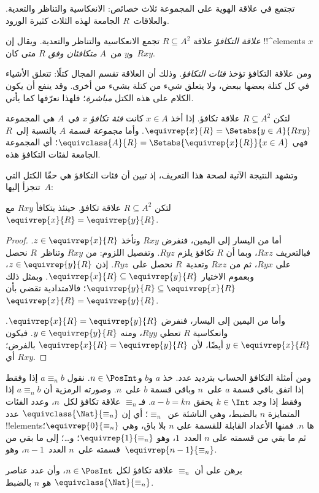 \documentclass[../../../include/open-logic-section]{subfiles}
\begin{document}


تجتمع في علاقة الهوية على المجموعة ثلاث خصائص: الانعكاسية والتناظر
والتعدية. والعلاقات~$R$ الجامعة لهذه الثلاث كثيرة الورود.

\begin{defn}
\emph{علاقة التكافؤ} علاقة $R \subseteq A^2$ تجمع الانعكاسية والتناظر
والتعدية. ويقال إن !!^{element}s $x$ و$y$ من~$A$
\emph{متكافئان وفق $R$} متى كان~$Rxy$.
\end{defn}

ومن علاقة التكافؤ تؤخذ \emph{فئات التكافؤ}. وذلك أن العلاقة تقسم
المجال كتلًا: تتعلق الأشياء في كل كتلة بعضها ببعض، ولا يتعلق شيء
من كتلة بشيء من أخرى. وقد ينفع أن يكون الكلام على هذه الكتل
\emph{مباشرة}؛ فلهذا نعرّفها كما يأتي.

\begin{defn}
لتكن $R \subseteq A^2$ علاقة تكافؤ. إذا أخذ $x \in A$ كانت
\emph{فئة تكافؤ} $x$ في~$A$ هي المجموعة $\equivrep{x}{R}
= \Setabs{y \in A}{Rxy}$. وأما \emph{مجموعة قسمة} $A$ بالنسبة
إلى~$R$ فهي $\equivclass{A}{R} = \Setabs{\equivrep{x}{R}}{x \in A}$؛
أي المجموعة الجامعة لفئات التكافؤ هذه.
\end{defn}

وتشهد النتيجة الآتية لصحة هذا التعريف، إذ تبين أن فئات التكافؤ
هي حقًا الكتل التي تتجزأ إليها~$A$:

\begin{prop}
لتكن $R \subseteq A^2$ علاقة تكافؤ. حينئذ يتكافأ $Rxy$ مع
$\equivrep{x}{R} = \equivrep{y}{R}$.
\end{prop}

\begin{proof}
أما من اليسار إلى اليمين، فنفرض $Rxy$ ونأخذ $z \in
\equivrep{x}{R}$. فبالتعريف $Rxz$، وبما أن $R$ تكافؤ يلزم $Ryz$.
وتفصيل اللزوم: من $Rxy$ وتناظر~$R$ نحصل على $Ryx$، ثم من
$Rxz$ وتعدية~$R$ نحصل على~$Ryz$. إذن $z \in \equivrep{y}{R}$،
وبعموم الاختيار $\equivrep{x}{R} \subseteq \equivrep{y}{R}$.
وبمثل ذلك $\equivrep{y}{R} \subseteq \equivrep{x}{R}$؛ فالامتدادية
تقضي بأن $\equivrep{x}{R} = \equivrep{y}{R}$.

وأما من اليمين إلى اليسار، فنفرض $\equivrep{x}{R} =
\equivrep{y}{R}$. وانعكاسية $R$ تعطي $Ryy$، ومنه
$y \in \equivrep{y}{R}$. فيكون $y \in \equivrep{x}{R}$ أيضًا،
لأن $\equivrep{x}{R} = \equivrep{y}{R}$ بالفرض؛ أي $Rxy$.
\end{proof}

\begin{ex}
ومن أمثلة التكافؤ الحساب بترديد عدد. خذ $a$ و$b$ و$n \in \PosInt$.
نقول $a \equiv_n b$ إذا وفقط إذا اتفق باقي قسمة $a$ على~$n$
وباقي قسمة $b$ على~$n$. وصورته الرمزية أن $a \equiv_n b$ إذا وفقط
إذا وجد $k \in \Int$ يحقق $a - b = kn$. فـ$\equiv_n$ علاقة تكافؤ
لكل~$n$، وعدد الفئات المتمايزة $n$ بالضبط، وهي الناشئة عن~$\equiv_n$؛ أي إن
$\equivclass{\Nat}{\equiv_n}$ عدد !!{element}sها $n$.
فمنها الأعداد القابلة للقسمة على $n$ بلا باق، وهي
$\equivrep{0}{\equiv_n}$؛ ثم ما بقي من قسمته على $n$ العدد~$1$،
وهو $\equivrep{1}{\equiv_n}$؛ و\ldots؛ إلى ما بقي من قسمته على~$n$
العدد~$n-1$، وهو~$\equivrep{n-1}{\equiv_n}$.
\end{ex}

\begin{prob}
برهن على أن $\equiv_n$ علاقة تكافؤ لكل $n \in \PosInt$، وأن
عدد عناصر $\equivclass{\Nat}{\equiv_n}$ هو $n$ بالضبط.
\end{prob}
\end{document}
